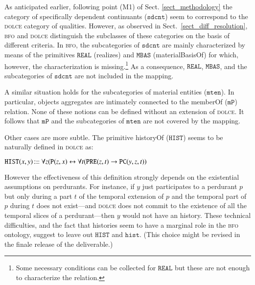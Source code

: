 \documentclass[ao]{iosart2x}
\newcommand{\bflist}{\begin{list}{}{\setlength{\topsep}{2mm}\setlength{\parsep}{0mm}\setlength{\leftmargin}{9.2mm}\setlength{\labelwidth}{8mm}}}
\newcommand{\eflist}{\end{list}}
\newcommand{\pr}[1]{\mathtt{#1}}
\newcommand{\cn}[1]{\mathtt{#1}}
\newcommand{\ifif}{\leftrightarrow}
\newcommand\textequal{%
 \rule[.08ex]{5pt}{0.35pt}\llap{\rule[.78ex]{5pt}{0.35pt}}}
\newcommand{\sdef}{{\hspace{1.5pt}:\hspace{-2.5pt}\textequal\hspace{3pt}}}
\newcommand{\dolce}{{\textsc{dolce}}}
\newcommand{\bfo}{{\textsc{bfo}}}
\newcommand {\Pd} {\ensuremath{\pr{P}}}
\newcommand {\PREd} {\ensuremath{\pr{PRE}}}
\newcommand {\PCd} {\ensuremath{\pr{PC}}}
\newcommand{\sdcntbcat}{\cn{sdcnt}}
\newcommand{\mtenbcat}{\cn{mten}}
\newcommand{\histbcat}{\cn{hist}}
\newcommand{\bfompart}{\pr{mP}}
\newcommand{\bforealizes}{\pr{REAL}}
\newcommand{\bfohistory}{\pr{HIST}}
\begin{document}
As anticipated earlier, following point (M1) of Sect. \ref{sect_methodology} the category of specifically dependent continuants ($\sdcntbcat$) seem to correspond to the {\dolce} category of qualities. However, as observed in Sect.~\ref{sect_diff_resolution}, {\bfo} and {\dolce} distinguish the subclasses of these categories on the basis of different criteria. In {\bfo}, the subcategories of $\sdcntbcat$ are mainly characterized by means of the primitives $\bforealizes$ (realizes) and $\pr{MBAS}$ (materialBasisOf) for which, however, the characterization is missing.\footnote{Some necessary conditions can be collected for $\bforealizes$ but these are not enough to characterize the relation.} As a consequence, $\bforealizes$, $\pr{MBAS}$, and the subcategories of $\sdcntbcat$ are not included in the mapping.

A similar situation holds for the subcategories of material entities ($\mtenbcat$). In particular, objects aggregates are intimately connected to the memberOf ($\bfompart$) relation. None of these notions can be defined without an extension of {\dolce}. It follows that $\bfompart$ and the subcategories of $\mtenbcat$ are not covered by the mapping.

Other cases are more subtle. The primitive historyOf ($\bfohistory$) seems to be naturally defined in {\dolce} as:
%
\bflist
\item[] $\bfohistory(x,y) \sdef \forall z(\Pd(z,x) \ifif \forall t(\PREd(z,t) \to \PCd(y,z,t))$
\eflist
%
However the effectiveness of this definition strongly depends on the existential assumptions on perdurants. For instance, if $y$ just participates to a perdurant $p$ but only during a part $t$ of the temporal  extension of $p$ and the temporal part of $p$ during $t$ does not exist---and {\dolce} does not commit to the existence of all the temporal slices of a perdurant---then $y$ would not have an history. These technical difficulties, and the fact that histories seem to have a marginal role in the {\bfo} ontology, suggest to leave out $\bfohistory$ and $\histbcat$. (This choice might be revised in the finale release of the deliverable.)
\end{document}
